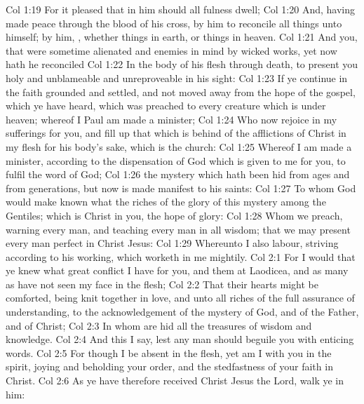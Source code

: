 \vs Col 1:19 For it pleased  that in him should all fulness dwell;
\vs Col 1:20 And, having made peace through the blood of his cross, by him to reconcile all things unto himself; by him, , whether  things in earth, or things in heaven.
\vs Col 1:21 And you, that were sometime alienated and enemies in  mind by wicked works, yet now hath he reconciled
\vs Col 1:22 In the body of his flesh through death, to present you holy and unblameable and unreproveable in his sight:
\vs Col 1:23 If ye continue in the faith grounded and settled, and  not moved away from the hope of the gospel, which ye have heard,  which was preached to every creature which is under heaven; whereof I Paul am made a minister;
\vs Col 1:24 Who now rejoice in my sufferings for you, and fill up that which is behind of the afflictions of Christ in my flesh for his body's sake, which is the church:
\vs Col 1:25 Whereof I am made a minister, according to the dispensation of God which is given to me for you, to fulfil the word of God;
\vs Col 1:26  the mystery which hath been hid from ages and from generations, but now is made manifest to his saints:
\vs Col 1:27 To whom God would make known what  the riches of the glory of this mystery among the Gentiles; which is Christ in you, the hope of glory:
\vs Col 1:28 Whom we preach, warning every man, and teaching every man in all wisdom; that we may present every man perfect in Christ Jesus:
\vs Col 1:29 Whereunto I also labour, striving according to his working, which worketh in me mightily.
\vs Col 2:1 For I would that ye knew what great conflict I have for you, and  them at Laodicea, and  as many as have not seen my face in the flesh;
\vs Col 2:2 That their hearts might be comforted, being knit together in love, and unto all riches of the full assurance of understanding, to the acknowledgement of the mystery of God, and of the Father, and of Christ;
\vs Col 2:3 In whom are hid all the treasures of wisdom and knowledge.
\vs Col 2:4 And this I say, lest any man should beguile you with enticing words.
\vs Col 2:5 For though I be absent in the flesh, yet am I with you in the spirit, joying and beholding your order, and the stedfastness of your faith in Christ.
\vs Col 2:6 As ye have therefore received Christ Jesus the Lord,  walk ye in him:
